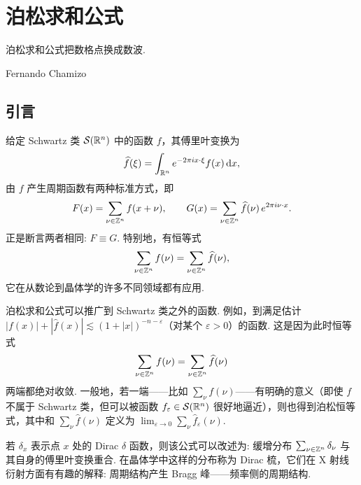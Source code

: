 
\chapter{泊松求和公式}

\epigraph{泊松求和公式把数格点换成数波.}{Fernando Chamizo}

\section{引言}

给定 Schwartz 类 $\mathcal{S}(\mathbb{R}^n)$ 中的函数 $f$，其傅里叶变换为
\begin{align*}
  \widehat{f}(\xi)=\int_{\mathbb{R}^{n}}e^{-2\pi i x\cdot\xi}f(x)\,\mathrm{d}x,
\end{align*}
由 $f$ 产生周期函数有两种标准方式，即
\begin{align*}
  F(x)=\sum_{\nu\in\mathbb{Z}^{n}}f(x+\nu),\qquad
  G(x)=\sum_{\nu\in\mathbb{Z}^{n}}\widehat{f}(\nu)\,e^{2\pi i\nu\cdot x}.
\end{align*}
正是断言两者相同: $F \equiv G$. 特别地，有恒等式
\begin{equation}\label{eq:7.1}
  \sum_{\nu\in\mathbb{Z}^{n}}f(\nu)=\sum_{\nu\in\mathbb{Z}^{n}}\widehat{f}(\nu),
\end{equation}
它在从数论到晶体学的许多不同领域都有应用.

泊松求和公式可以推广到 Schwartz 类之外的函数. 例如，到满足估计 $|f(x)| + |\widehat{f}(x)| \lesssim (1 + |x|)^{-n-\varepsilon}$（对某个 $\varepsilon > 0$）的函数. 这是因为此时恒等式
\begin{align*}
  \sum_{\nu\in\mathbb{Z}^{n}}f(\nu)=\sum_{\nu\in\mathbb{Z}^{n}}\widehat{f}(\nu)
\end{align*}
两端都绝对收敛. 一般地，若一端——比如 $\sum_{\nu} f(\nu)$——有明确的意义（即使 $f$ 不属于 Schwartz 类，但可以被函数 $f_{\varepsilon} \in \mathcal{S}(\mathbb{R}^{n})$ 很好地逼近），则也得到泊松恒等式，其中和 $\sum_{\nu} \widehat{f}(\nu)$ 定义为 $\lim_{\varepsilon \to 0} \sum_{\nu} \widehat{f}_{\varepsilon}(\nu)$.

若 $\delta_x$ 表示点 $x$ 处的 Dirac $\delta$ 函数，则该公式可以改述为: 缓增分布 $\sum_{\nu \in \mathbb{Z}^n} \delta_\nu$ 与其自身的傅里叶变换重合. 在晶体学中这样的分布称为 Dirac 梳，它们在 X 射线衍射方面有有趣的解释: 周期结构产生 Bragg 峰——频率侧的周期结构.

